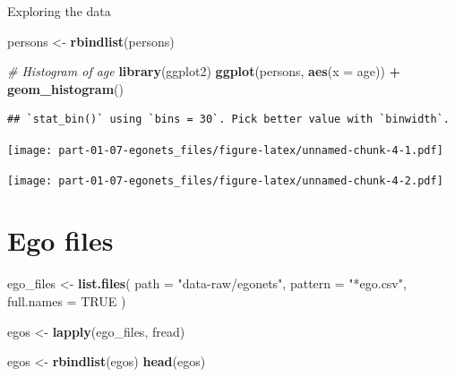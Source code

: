 \documentclass[
]{book}
\newenvironment{Shaded}{\begin{snugshade}}{\end{snugshade}}
\newcommand{\AttributeTok}[1]{\textcolor[rgb]{0.13,0.29,0.53}{#1}}
\newcommand{\CommentTok}[1]{\textcolor[rgb]{0.56,0.35,0.01}{\textit{#1}}}
\newcommand{\ConstantTok}[1]{\textcolor[rgb]{0.56,0.35,0.01}{#1}}
\newcommand{\FunctionTok}[1]{\textcolor[rgb]{0.13,0.29,0.53}{\textbf{#1}}}
\newcommand{\NormalTok}[1]{#1}
\newcommand{\OtherTok}[1]{\textcolor[rgb]{0.56,0.35,0.01}{#1}}
\newcommand{\SpecialCharTok}[1]{\textcolor[rgb]{0.81,0.36,0.00}{\textbf{#1}}}
\newcommand{\StringTok}[1]{\textcolor[rgb]{0.31,0.60,0.02}{#1}}
\begin{document}
Exploring the data

\begin{Shaded}
\begin{Highlighting}[]
\NormalTok{persons }\OtherTok{\textless{}{-}} \FunctionTok{rbindlist}\NormalTok{(persons)}

\CommentTok{\# Histogram of age}
\FunctionTok{library}\NormalTok{(ggplot2)}
\FunctionTok{ggplot}\NormalTok{(persons, }\FunctionTok{aes}\NormalTok{(}\AttributeTok{x =}\NormalTok{ age)) }\SpecialCharTok{+}
  \FunctionTok{geom\_histogram}\NormalTok{()}
\end{Highlighting}
\end{Shaded}

\begin{verbatim}
## `stat_bin()` using `bins = 30`. Pick better value with `binwidth`.
\end{verbatim}

\texttt{[image: part-01-07-egonets\_files/figure-latex/unnamed-chunk-4-1.pdf]}

\begin{Shaded}
\end{Shaded}

\texttt{[image: part-01-07-egonets\_files/figure-latex/unnamed-chunk-4-2.pdf]}

\hypertarget{ego-files}{%
\section{Ego files}\label{ego-files}}

\begin{Shaded}
\begin{Highlighting}[]
\NormalTok{ego\_files }\OtherTok{\textless{}{-}} \FunctionTok{list.files}\NormalTok{(}
  \AttributeTok{path       =} \StringTok{"data{-}raw/egonets"}\NormalTok{,}
  \AttributeTok{pattern    =} \StringTok{"*ego.csv"}\NormalTok{,}
  \AttributeTok{full.names =} \ConstantTok{TRUE}
\NormalTok{  )}

\NormalTok{egos }\OtherTok{\textless{}{-}} \FunctionTok{lapply}\NormalTok{(ego\_files, fread)}

\NormalTok{egos }\OtherTok{\textless{}{-}} \FunctionTok{rbindlist}\NormalTok{(egos)}
\FunctionTok{head}\NormalTok{(egos)}
\end{Highlighting}
\end{Shaded}
\end{document}
